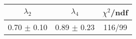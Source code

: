 \begin{tabular}{c|c||c}
$\lambda_{2}$ & $\lambda_4$ & $\chi^{2}$/ndf \\
\hline
0.70 $\pm$ 0.10 & 0.89 $\pm$ 0.23 & 116/99\\
\end{tabular}
